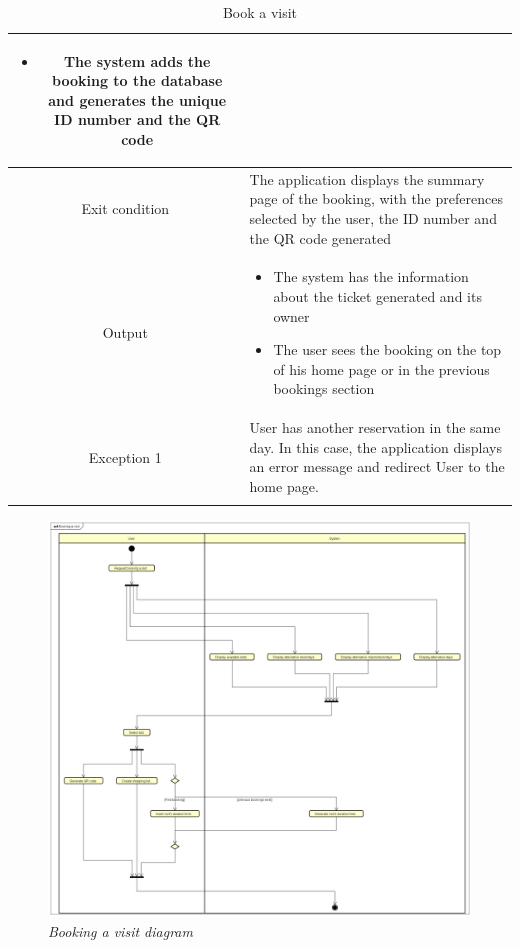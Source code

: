 \documentclass[table, 12pt]{article}
\begin{document}
\begin{longtable}{|c| p{10cm}|}
\begin{itemize}[nosep,after=\strut]
        \item The system adds the booking to the database and generates the unique ID number and the QR code
    \end{itemize}                                                                                                                   \\
    \hline
    Exit condition   & The application displays the summary page of the booking, with the preferences selected by the user, the ID number and the QR code generated \\ \hline
    Output           & \begin{itemize}
        \item   The system has the information about the ticket generated and its owner
        \item The user sees the booking on the top of his home page or in the previous bookings section

    \end{itemize}
    \\
    \hline
    \hline
    Exception 1      & User has another reservation in the same day. In this case, the application displays an error message and redirect User to the home page.    \\
    \hline
    \caption{Book a visit}                                                                                                                                          \\
\end{longtable}




\begin{figure}[H]
    \centering
    \includegraphics[scale=0.26]{assets/Activity-Diagrams/act_booking.png}
    \caption{\textit{Booking a visit diagram}}
\end{figure}
\newpage
\end{document}
